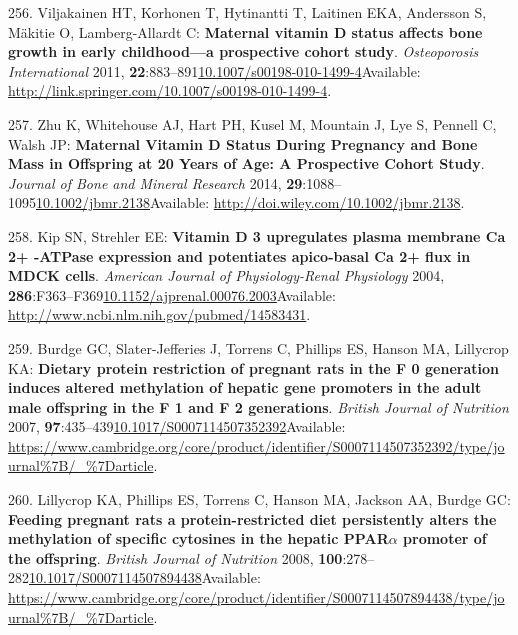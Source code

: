 \documentclass[
]{book}
\begin{document}
\leavevmode\hypertarget{ref-Viljakainen2011}{}%
256. Viljakainen HT, Korhonen T, Hytinantti T, Laitinen EKA, Andersson S, Mäkitie O, Lamberg-Allardt C: \textbf{Maternal vitamin D status affects bone growth in early childhood---a prospective cohort study}. \emph{Osteoporosis International} 2011, \textbf{22}:883--891\href{https://doi.org/10.1007/s00198-010-1499-4}{10.1007/s00198-010-1499-4}Available: \url{http://link.springer.com/10.1007/s00198-010-1499-4}.

\leavevmode\hypertarget{ref-Zhu2014a}{}%
257. Zhu K, Whitehouse AJ, Hart PH, Kusel M, Mountain J, Lye S, Pennell C, Walsh JP: \textbf{Maternal Vitamin D Status During Pregnancy and Bone Mass in Offspring at 20 Years of Age: A Prospective Cohort Study}. \emph{Journal of Bone and Mineral Research} 2014, \textbf{29}:1088--1095\href{https://doi.org/10.1002/jbmr.2138}{10.1002/jbmr.2138}Available: \url{http://doi.wiley.com/10.1002/jbmr.2138}.

\leavevmode\hypertarget{ref-Kip2004}{}%
258. Kip SN, Strehler EE: \textbf{Vitamin D 3 upregulates plasma membrane Ca 2+ -ATPase expression and potentiates apico-basal Ca 2+ flux in MDCK cells}. \emph{American Journal of Physiology-Renal Physiology} 2004, \textbf{286}:F363--F369\href{https://doi.org/10.1152/ajprenal.00076.2003}{10.1152/ajprenal.00076.2003}Available: \url{http://www.ncbi.nlm.nih.gov/pubmed/14583431}.

\leavevmode\hypertarget{ref-Burdge2007a}{}%
259. Burdge GC, Slater-Jefferies J, Torrens C, Phillips ES, Hanson MA, Lillycrop KA: \textbf{Dietary protein restriction of pregnant rats in the F 0 generation induces altered methylation of hepatic gene promoters in the adult male offspring in the F 1 and F 2 generations}. \emph{British Journal of Nutrition} 2007, \textbf{97}:435--439\href{https://doi.org/10.1017/S0007114507352392}{10.1017/S0007114507352392}Available: \url{https://www.cambridge.org/core/product/identifier/S0007114507352392/type/journal\%7B/_\%7Darticle}.

\leavevmode\hypertarget{ref-Lillycrop2008}{}%
260. Lillycrop KA, Phillips ES, Torrens C, Hanson MA, Jackson AA, Burdge GC: \textbf{Feeding pregnant rats a protein-restricted diet persistently alters the methylation of specific cytosines in the hepatic PPAR\(\alpha\) promoter of the offspring}. \emph{British Journal of Nutrition} 2008, \textbf{100}:278--282\href{https://doi.org/10.1017/S0007114507894438}{10.1017/S0007114507894438}Available: \url{https://www.cambridge.org/core/product/identifier/S0007114507894438/type/journal\%7B/_\%7Darticle}.
\end{document}
